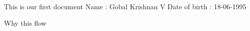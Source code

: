 \documentclass{article}
\begin{document}
This is our first document
Name : Gobal Krishnan V
Date of birth : 18-06-1995

Why this flow
\end{document}
